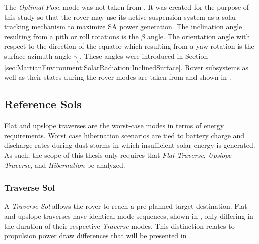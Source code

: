 
The \textit{Optimal Pose} mode was not taken from . It was created for the purpose of this study so that the rover may use its active suspension system as a solar tracking mechanism to maximize \ac{SA} power generation. The inclination angle resulting from a pith or roll rotations is  the $\beta$ angle. The orientation angle with respect to the direction of the equator which resulting from a yaw rotation is the surface azimuth angle $\gamma_{c}$. These angles were introduced in Section \ref{sec:MartianEnvironment:SolarRadiation:InclinedSurface}. Rover subsystems as well as their states during the rover modes are taken from  and shown in .






\subsection{Reference Sols}
\label{sec:ReferenceSols:ReferenceSols}
Flat and upslope traverses are the worst-case modes in terms of energy requirements. Worst case hibernation scenarios are tied to battery charge and discharge rates during dust storms in which insufficient solar energy is generated. As such, the scope of this thesis only requires that \textit{Flat Traverse}, \textit{Upslope Traverse}, and \textit{Hibernation} be analyzed.


\subsubsection{Traverse Sol}
\label{sec:ReferenceSols:TraverseSol}
A \textit{Traverse Sol} allows the rover to reach a pre-planned target destination. Flat and upslope traverses have identical mode sequences, shown in , only differing in the duration of their respective \textit{Traverse} modes. This distinction relates to propulsion power draw differences that will be presented in .

